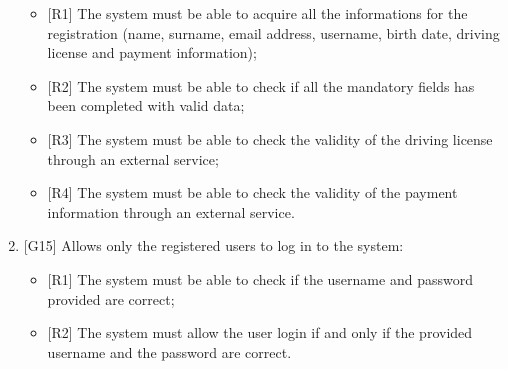\begin{enumerate}
\begin{itemize}
	\item {[R1]} The system must be able to acquire all the informations for the registration (name, surname, email address, username, birth date, driving license and payment information);
	\item {[R2]} The system must be able to check if all the mandatory fields has been completed with valid data;
	\item {[R3]} The system must be able to check the validity of the driving license through an external service;
	\item {[R4]} The system must be able to check the validity of the payment information through an external service.
\end{itemize}

\item {[G15]} Allows only the registered users to log in to the system:

\begin{itemize}
	\item {[R1]} The system must be able to check if the username and password provided are correct;
	\item {[R2]} The system must allow the user login if and only if the provided username and the password are correct.
\end{itemize}

\end{enumerate}